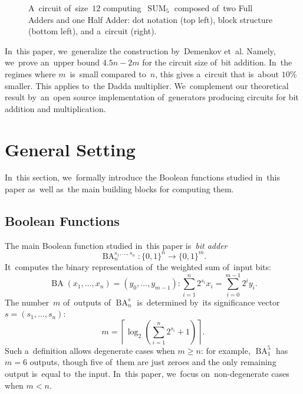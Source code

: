 \documentclass[a4paper, UKenglish, cleveref, autoref,  thm-restate, anonymous]{lipics-v2021}
\DeclareMathOperator{\SUM}{SUM}
\DeclareMathOperator{\BA}{BA}
\begin{document}
\begin{figure}[ht]
\begin{center}
        \end{center}
        \caption{A~circuit of~size~$12$ computing~$\SUM_5$ composed of~two Full Adders and one Half Adder: dot notation (top left), block structure (bottom left), and a~circuit (right).}
        \label{figure:sumfive}
    \end{figure}


    In~this paper, we~generalize the construction by~Demenkov et~al.
    Namely, we~prove an~upper bound $4.5n-2m$
    for the circuit size of~bit addition.
    In~the regimes where $m$~is~small
    compared to~$n$, this gives a~circuit that is~about $10\%$ smaller.
    This applies to~the Dadda multiplier.
    We~complement our theoretical result by~an~open source implementation
    of~generators producing circuits for bit addition and multiplication.

    \section{General Setting}
    In~this section,
    we~formally introduce the Boolean functions
    studied in~this paper as~well as~the main building blocks
    for computing them.

    \subsection{Boolean Functions}
    The main Boolean function studied in~this paper
    is~\emph{bit adder}
    \[\BA_n^{s_1, \dotsc, s_n} \colon \{0,1\}^n \to \{0,1\}^m.\]
    It~computes the binary representation of~the weighted sum of~input bits:
    \[\BA(x_1, \dotsc, x_n)=(y_0, \dotsc, y_{m-1}) \colon \sum_{i=1}^{n}2^{s_i}x_i=\sum_{i=0}^{m-1}2^iy_i.\]
    The number~$m$ of~outputs of $\BA_n^s$ is~determined by~its significance vector $s=(s_1, \dotsc, s_n)$:
    \[m=\left\lceil \log_2\left( \sum_{i=1}^{n}2^{s_i} + 1\right) \right\rceil.\]
    Such a~definition allows degenerate cases when $m \ge n$: for example, $\BA_1^{5}$ has
    $m=6$ outputs, though five of~them are just zeroes and the only remaining output is~equal
    to~the input. In~this paper, we~focus on~non-degenerate cases when $m<n$.
\end{document}
